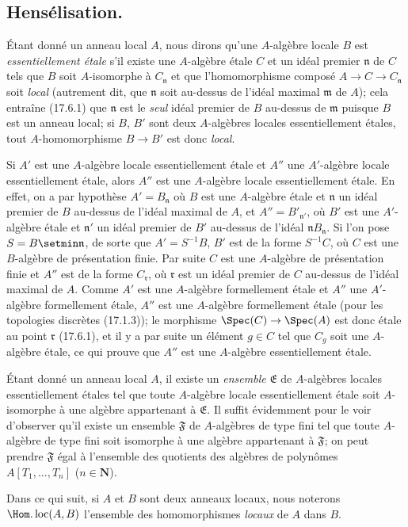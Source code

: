 \subsection{Hensélisation.}

\begin{env}[18.6.1]
Étant donné un anneau local $A$, nous dirons qu'une $A$-algèbre locale $B$ est \emph{essentiellement étale} s'il existe une $A$-algèbre étale $C$ et un idéal premier $\mathfrak n$ de $C$ tels que $B$ soit $A$-isomorphe à $C_{\mathfrak n}$ et que l'homomorphisme composé $A\to C\to C_{\mathfrak n}$ soit \emph{local} (autrement dit, que $\mathfrak n$ soit au-dessus de l'idéal maximal $\mathfrak m$ de $A$); cela entraîne (17.6.1) que $\mathfrak n$ est le \emph{seul} idéal premier de $B$ au-dessus de $\mathfrak m$ puisque $B$ est un anneau local; si $B$, $B'$ sont deux $A$-algèbres locales essentiellement étales, tout $A$-homomorphisme $B\to B'$ est donc \emph{local}.

Si $A'$ est une $A$-algèbre locale essentiellement étale et $A''$ une $A'$-algèbre locale essentiellement étale, alors $A''$ est une $A$-algèbre locale essentiellement étale. En effet, on a par hypothèse $A'=B_{\mathfrak n}$ où $B$ est une $A$-algèbre étale et $\mathfrak n$ un idéal premier de $B$ au-dessus de l'idéal maximal de $A$, et $A''=B'_{\mathfrak n'}$, où $B'$ est une $A'$-algèbre étale et $\mathfrak n'$ un idéal premier de $B'$ au-dessus de l'idéal $\mathfrak nB_{\mathfrak n}$. Si l'on pose $S=B\setmin\mathfrak n$, de sorte que $A'=S^{-1}B$, $B'$ est de la forme $S^{-1}C$, où $C$ est une $B$-algèbre de présentation finie. Par suite $C$ est une $A$-algèbre de présentation finie et $A''$ est de la forme $C_{\mathfrak r}$, où $\mathfrak r$ est un idéal premier de $C$ au-dessus de l'idéal maximal de $A$. Comme $A'$ est une $A$-algèbre formellement étale et $A''$ une $A'$-algèbre formellement étale, $A''$ est une $A$-algèbre formellement
étale (pour les topologies discrètes (17.1.3)); le morphisme $\Spec(C)\to\Spec(A)$ est donc étale au point $\mathfrak r$ (17.6.1), et il y a par suite un élément $g\in C$ tel que $C_g$ soit une $A$-algèbre étale, ce qui prouve que $A''$ est une $A$-algèbre essentiellement étale.

Étant donné un anneau local $A$, il existe un \emph{ensemble} $\mathfrak E$ de $A$-algèbres locales essentiellement étales tel que toute $A$-algèbre locale essentiellement étale soit $A$-isomorphe à une algèbre appartenant à $\mathfrak E$. Il suffit évidemment pour le voir d'observer qu'il existe un ensemble $\mathfrak F$ de $A$-algèbres de type fini tel que toute $A$-algèbre de type fini soit isomorphe à une algèbre appartenant à $\mathfrak F$; on peut prendre $\mathfrak F$ égal à l'ensemble des quotients des algèbres de polynômes $A[T_1,\ldots,T_n]$ ($n\in\mathbf N$).

Dans ce qui suit, si $A$ et $B$ sont deux anneaux locaux, nous noterons $\Hom.\operatorname{loc}(A,B)$ l'ensemble des homomorphismes \emph{locaux} de $A$ dans $B$.
\end{env}

